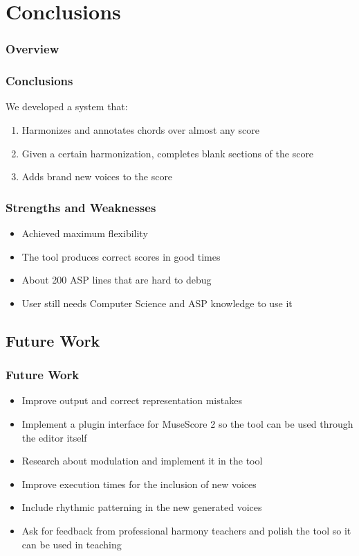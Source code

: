 \documentclass[english]{beamer}
\begin{document}
\section{Conclusions}
\begin{frame}
	\frametitle{Overview}
\end{frame}
		\begin{frame}
			\frametitle{Conclusions}
			We developed a system that:
			\begin{enumerate}
				\item \alert{Harmonizes} and annotates chords over almost any score
				\item Given a certain harmonization, \alert{completes blank sections} of the score
				\item \alert{Adds brand new voices} to the score 
			\end{enumerate}
		\end{frame}
		\begin{frame}
			\frametitle{Strengths and Weaknesses}
			\begin{itemize}
				  \item<pro@1-> Achieved \alert{maximum flexibility}
			      \item<pro@1-> The tool produces correct scores in good times
			      \end{itemize}
			      \pause
			      \begin{itemize}
			      \item<con@1-> About 200 ASP lines that are hard to debug
			      \item<con@1-> User still needs \alert{Computer Science and ASP knowledge} to use it
			    \end{itemize}
		\end{frame}
	
\subsection{Future Work}
	\begin{frame}
		\frametitle{Future Work}
		\begin{itemize}
			\item Improve \alert{output} and correct representation mistakes
			\item Implement a \alert{plugin interface} for MuseScore 2 so the tool can be used through the editor itself
			\item Research about \alert{modulation} and implement it in the tool
			\item Improve execution times for the inclusion of new voices
			\item Include \alert{rhythmic patterning} in the new generated voices
			\item Ask for feedback from professional harmony teachers and polish the tool so it can be used in teaching
		\end{itemize}
	\end{frame}
		
\end{document}
